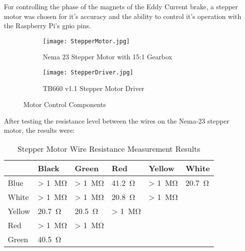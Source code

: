 For controlling the phase of the magnets of the Eddy Current brake, a stepper motor was chosen for it's accuracy and the ability to control it's operation with the Raspberry Pi's \acs{gpio} pins.

\begin{figure}[H]
	\centering
	\begin{subfigure}[t]{.550\textwidth}
		\centering
		\texttt{[image: StepperMotor.jpg]}
		\caption{Nema 23 Stepper Motor with 15:1 Gearbox}
		\citep{Robotics:2022}
		\label{fig:stepper}
	\end{subfigure}
	\begin{subfigure}[t]{.41\textwidth}
		\centering
		\texttt{[image: StepperDriver.jpg]}
		\caption{TB660 v1.1 Stepper Motor Driver}
		\citep{Communica:2022}
		\label{fig:motorDriver}
	\end{subfigure}
	\caption{Motor Control Components}
	\label{fig:Motor}
\end{figure}



After testing the resistance level between the wires on the Nema-23 stepper motor, the results were:

\begin{table}[H]
	\centering
	\caption{Stepper Motor Wire Resistance Measurement Results}
	\begin{tabularx}{\textwidth}{X X X X X X  }
		\toprule
		       & Black               & Green                 & Red                   & Yellow                & White                 \\
		\midrule
		Blue   & > \SI{1}{\mega\ohm} & > \SI{1}{\mega\ohm}   & \SI{41.2}{\ohm}       & > \SI{1}{\mega\ohm}   & \SI{20.7}{\ohm}       \\
		White  & > \SI{1}{\mega\ohm} & > \SI{1}{\mega\ohm}   & \SI{20.8}{\ohm}       & > \SI{1}{\mega\ohm}   & \cellcolor{lightgray} \\
		Yellow & \SI{20.7}{\ohm}     & \SI{20.5}{\ohm}       & > \SI{1}{\mega\ohm}   & \cellcolor{lightgray} & \cellcolor{lightgray} \\
		Red    & > \SI{1}{\mega\ohm} & > \SI{1}{\mega\ohm}   & \cellcolor{lightgray} & \cellcolor{lightgray} & \cellcolor{lightgray} \\
		Green  & \SI{40.5}{\ohm}     & \cellcolor{lightgray} & \cellcolor{lightgray} & \cellcolor{lightgray} & \cellcolor{lightgray} \\
		\bottomrule
	\end{tabularx}
	\label{tab:nemaTest}
\end{table}

